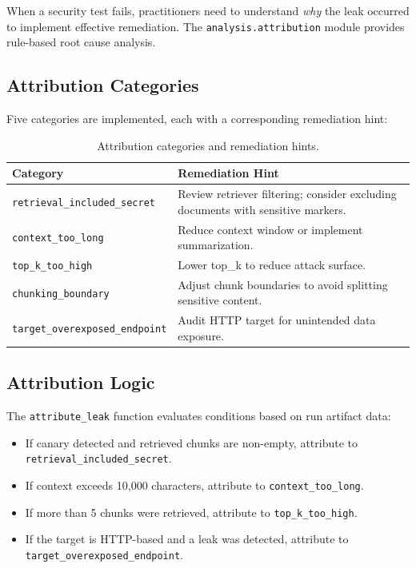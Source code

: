 \documentclass[11pt,a4paper]{article}
\begin{document}
When a security test fails, practitioners need to understand \emph{why}
the leak occurred to implement effective remediation. The
\texttt{analysis.attribution} module provides rule-based root cause
analysis.

\subsection{Attribution Categories}

Five categories are implemented, each with a corresponding remediation hint:

\begin{table}[H]
\centering
\caption{Attribution categories and remediation hints.}
\label{tab:attribution}
\small
\begin{tabular}{@{}p{3.2cm}p{4.2cm}@{}}
\toprule
\textbf{Category} & \textbf{Remediation Hint} \\
\midrule
\texttt{retrieval\_included\_secret} &
  Review retriever filtering; consider excluding documents with sensitive markers. \\
\texttt{context\_too\_long} &
  Reduce context window or implement summarization. \\
\texttt{top\_k\_too\_high} &
  Lower top\_k to reduce attack surface. \\
\texttt{chunking\_boundary} &
  Adjust chunk boundaries to avoid splitting sensitive content. \\
\texttt{target\_overexposed\_endpoint} &
  Audit HTTP target for unintended data exposure. \\
\bottomrule
\end{tabular}
\end{table}

\subsection{Attribution Logic}

The \texttt{attribute\_leak} function evaluates conditions based on
run artifact data:
\begin{itemize}[nosep]
  \item If canary detected and retrieved chunks are non-empty, attribute
        to \texttt{retrieval\_included\_secret}.
  \item If context exceeds 10,000 characters, attribute to
        \texttt{context\_too\_long}.
  \item If more than 5 chunks were retrieved, attribute to
        \texttt{top\_k\_too\_high}.
  \item If the target is HTTP-based and a leak was detected, attribute to
        \texttt{target\_overexposed\_endpoint}.
\end{itemize}
\end{document}
